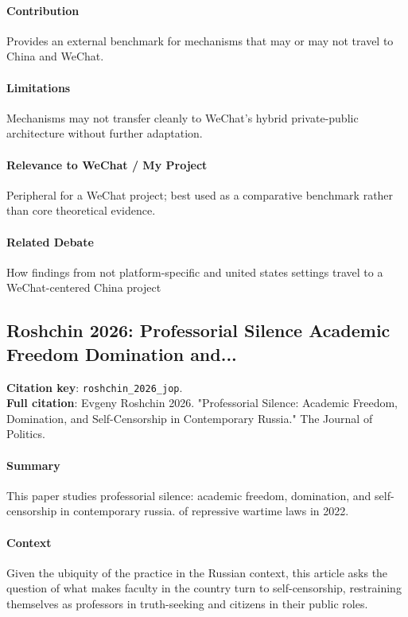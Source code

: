 \documentclass[12pt]{article}
\begin{document}
\paragraph{Contribution} Provides an external benchmark for mechanisms that may or may not travel to China and WeChat.

\paragraph{Limitations} Mechanisms may not transfer cleanly to WeChat's hybrid private-public architecture without further adaptation.

\paragraph{Relevance to WeChat / My Project} Peripheral for a WeChat project; best used as a comparative benchmark rather than core theoretical evidence.

\paragraph{Related Debate} How findings from not platform-specific and united states settings travel to a WeChat-centered China project


\subsection{Roshchin 2026: Professorial Silence Academic Freedom Domination and...}
\textbf{Citation key}: \texttt{roshchin\_2026\_jop}.\\
\textbf{Full citation}: Evgeny Roshchin 2026. "Professorial Silence: Academic Freedom, Domination, and Self-Censorship in Contemporary Russia." The Journal of Politics.

\paragraph{Summary} This paper studies professorial silence: academic freedom, domination, and self-censorship in contemporary russia. of repressive wartime laws in 2022.

\paragraph{Context} Given the ubiquity of the practice in the Russian context, this article asks the question of what makes faculty in the country turn to self-censorship, restraining themselves as professors in truth-seeking and citizens in their public roles.
\end{document}
